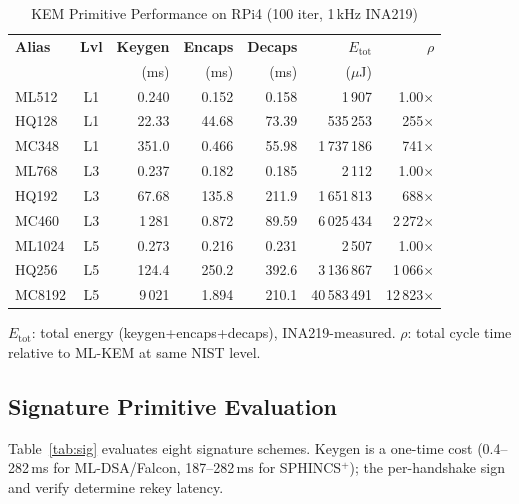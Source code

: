 \begin{table}[t]
\centering
\caption{KEM Primitive Performance on RPi4 (100 iter, 1\,kHz INA219)}
\label{tab:kem}
\footnotesize
\setlength{\tabcolsep}{3.5pt}
\begin{tabular}{@{}lcrrrrr@{}}
\toprule
\textbf{Alias} & \textbf{Lvl} &
  \textbf{Keygen} & \textbf{Encaps} & \textbf{Decaps} &
  \textbf{$E_\text{tot}$} &
  \textbf{$\rho$} \\
& & (ms) & (ms) & (ms) & ($\mu$J) & \\
\midrule
ML512  & L1 & 0.240 & 0.152 & 0.158 & 1\,907    & 1.00$\times$ \\
HQ128  & L1 & 22.33 & 44.68 & 73.39 & 535\,253  & 255$\times$ \\
MC348  & L1 & 351.0 & 0.466 & 55.98 & 1\,737\,186 & 741$\times$ \\
\midrule
ML768  & L3 & 0.237 & 0.182 & 0.185 & 2\,112    & 1.00$\times$ \\
HQ192  & L3 & 67.68 & 135.8 & 211.9 & 1\,651\,813 & 688$\times$ \\
MC460  & L3 & 1\,281 & 0.872 & 89.59 & 6\,025\,434 & 2\,272$\times$ \\
\midrule
ML1024 & L5 & 0.273 & 0.216 & 0.231 & 2\,507    & 1.00$\times$ \\
HQ256  & L5 & 124.4 & 250.2 & 392.6 & 3\,136\,867 & 1\,066$\times$ \\
MC8192 & L5 & 9\,021 & 1.894 & 210.1 & 40\,583\,491 & 12\,823$\times$ \\
\bottomrule
\end{tabular}
\begin{tablenotes}
\footnotesize
\item $E_\text{tot}$: total energy (keygen+encaps+decaps), INA219-measured.
  $\rho$: total cycle time relative to ML-KEM at same NIST level.
\end{tablenotes}
\end{table}

\subsection{Signature Primitive Evaluation}
\label{sec:sig}

Table~\ref{tab:sig} evaluates eight signature schemes.  Keygen is a
one-time cost (0.4--282\,ms for ML-DSA/Falcon, 187--282\,ms for
SPHINCS$^+$); the per-handshake sign and verify determine rekey
latency.

